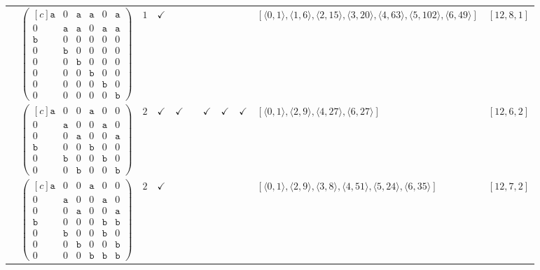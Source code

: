 \documentclass[12pt]{article}
\theoremstyle{definition}
\theoremstyle{plain}
\begin{document}
{\begin{longtable}{@{}cYcccccccZc@{}}
& $\begin{pmatrix*}[c]
\mathtt{a}  &  0  &  \mathtt{a}  &  \mathtt{a}  &  0  &  \mathtt{a}  \\
0  &  \mathtt{a}  &  \mathtt{a}  &  0  &  \mathtt{a}  &  \mathtt{a}  \\
\mathtt{b}  &  0  &  0  &  0  &  0  &  0  \\
0  &  \mathtt{b}  &  0  &  0  &  0  & 0  \\
0  &  0  &  \mathtt{b}  &  0  &  0  & 0   \\
0  &  0  &  0  &  \mathtt{b}  &  0   &  0  \\
0  &  0  &  0  &  0  &  \mathtt{b}   &  0  \\
0  &  0  &  0  &  0  &  0   &  \mathtt{b}
\end{pmatrix*}$
& $1$
& $\checkmark$
&
&
&
&
&
& $[\langle0,1\rangle,\allowbreak\langle1,6\rangle,\allowbreak\langle2,15\rangle,\allowbreak\langle3,20\rangle,\allowbreak\langle4,63\rangle,\allowbreak\langle5,102\rangle,\allowbreak\langle6,49\rangle]$  & $[12,8,1]$
 \\

\cmidrule(lr){2-11}

& $\begin{pmatrix*}[c]
\mathtt{a}  &  0  &  0  &  \mathtt{a}  &  0  &  0  \\
0  &  \mathtt{a}  &  0  &  0  &  \mathtt{a}  &  0  \\
0  &  0  &  \mathtt{a}  &  0  &  0  &  \mathtt{a}  \\
\mathtt{b}  &  0  &  0  &  \mathtt{b}  &  0  &  0  \\
0  &  \mathtt{b}  &  0  &  0  &  \mathtt{b}  &  0  \\
0  &  0  &  \mathtt{b}  &  0  &  0  &  \mathtt{b}
\end{pmatrix*}$
& $2$
& $\checkmark$
& $\checkmark$
&
& $\checkmark$
& $\checkmark$
& $\checkmark$
& $[\langle0,1\rangle,\allowbreak\langle2,9\rangle,\allowbreak\langle4,27\rangle,\allowbreak\langle6,27\rangle]$
& $[12,6,2]$     \\

\cmidrule(lr){2-11}


& $\begin{pmatrix*}[c]
\mathtt{a}  &  0  &  0  &  \mathtt{a}  &  0  &  0  \\
0  &  \mathtt{a}  &  0  &  0  &  \mathtt{a}  &  0  \\
0  &  0  &  \mathtt{a}  &  0  &  0  &  \mathtt{a}  \\
\mathtt{b}  &  0  &  0  &  0  &  \mathtt{b}  &  \mathtt{b}  \\
0  &  \mathtt{b}  &  0  &  0  &  \mathtt{b}  &  0  \\
0  &  0  &  \mathtt{b}  &  0  &  0  &  \mathtt{b}  \\
0  &  0  &  0  &  \mathtt{b}  &  \mathtt{b}  &  \mathtt{b}
\end{pmatrix*}$
& $2$
& $\checkmark$
&
&
&
&
&
& $[\langle0,1\rangle,\allowbreak\langle2,9\rangle,\allowbreak\langle3,8\rangle,\allowbreak\langle4,51\rangle,\allowbreak\langle5,24\rangle,\allowbreak\langle6,35\rangle]$
& $[12,7,2]$   \\


\end{longtable}}
\end{document}
